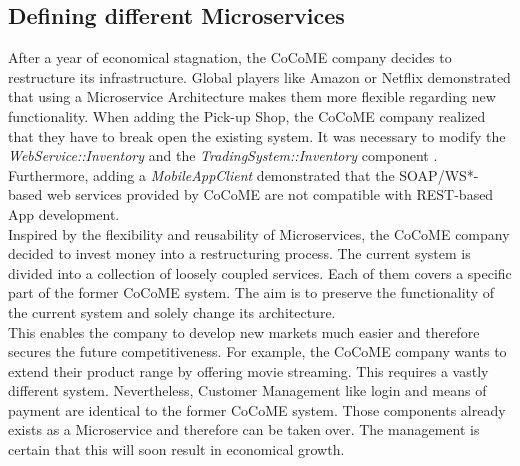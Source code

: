 \subsection{Defining different Microservices}
After a year of economical stagnation, the CoCoME company decides to restructure its infrastructure. Global players like Amazon or Netflix demonstrated that using a Microservice Architecture makes them more flexible regarding new functionality. When adding the Pick-up Shop, the CoCoME company realized that they have to break open the existing system. It was necessary to modify the \textit{WebService::Inventory} and the \textit{TradingSystem::Inventory} component \cite{HeinrichRostamiReussner2016_1000052688}. Furthermore, adding a \textit{MobileAppClient} demonstrated that the SOAP/WS*-based web services provided by CoCoME are not compatible with REST-based App development.
\\
Inspired by the flexibility and reusability of Microservices, the CoCoME company decided to invest money into a restructuring process. The current system is divided into a collection of loosely coupled services. Each of them covers a specific part of the former CoCoME system. The aim is to preserve the functionality of the current system and solely change its architecture.
\\
 This enables the company to develop new markets much easier and therefore secures the future competitiveness. For example, the CoCoME company wants to extend their product range by offering movie streaming. This requires a vastly different system. Nevertheless, Customer Management like login and means of payment are identical to the former CoCoME system. Those components already exists as a Microservice and therefore can be taken over. The management is certain that this will soon result in economical growth.








	
	
